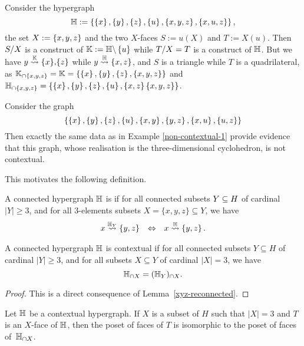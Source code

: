 \begin{example} \label{non-contextual-1}
Consider the hypergraph 
\[
  {\mathbb H}:= \left\{\left\{x\right\},\left\{y\right\},\left\{z\right\},\left\{u\right\},\left\{x,y,z\right\}, \left\{x,u,z\right\}\right\},
  \]
the set $X:=\left\{x,y,z\right\}$ and the two $X$-faces $S:=u(X)$ and $T:=X(u)$. 
Then $S/X$ is a construct of ${\mathbb K}:={\mathbb H}\backslash \left\{u\right\}$ while $T/X=T$ is a construct of ${\mathbb H}$.
But we have $y\stackrel{{\mathbb K}}{\rightsquigarrow}\left\{x\right\}\!,\!\left\{z\right\}$ while $y\stackrel{{\mathbb H}}{\rightsquigarrow}\left\{x,z\right\}$, and $S$ is a triangle while $T$ is a quadrilateral, as
${\mathbb K}_{\cap \left\{x,y,z\right\}} = {\mathbb K}  =  \left\{\left\{x\right\},\left\{y\right\},\left\{z\right\},\left\{x,y,z\right\}\right\}$ and ${\mathbb H}_{\cap \left\{x,y,z\right\}}  =  \left\{\left\{x\right\},\left\{y\right\},\left\{z\right\},\left\{u\right\},\left\{x,z\right\}\left\{x,y,z\right\}\right\}$.
\end{example}
  
\begin{example} 
  \label{non-contextual-2}
Consider the graph 
$$\left\{\left\{x\right\},\left\{y\right\},\left\{z\right\},\left\{u\right\},\left\{x,y\right\}, \left\{y,z\right\}, \left\{x,u\right\}, \left\{u,z\right\}\right\}$$
Then exactly the same data as in Example \ref{non-contextual-1} provide evidence that this graph, whose realisation is the three-dimensional cyclohedron, is not contextual. 
\end{example}

This motivates the following definition.

\begin{definition} 
A connected hypergraph ${\mathbb H}$ is  if for all connected subsets $Y\subseteq H$ of cardinal $|Y|\geq 3$, and for all $3$-elements subsets $X=\{x,y,z\} \subseteq Y$, we have 
$$\begin{array}{lll}
  x\stackrel{{{\mathbb H}_Y}}{\rightsquigarrow}\left\{y,z\right\} & \Leftrightarrow & x\stackrel{{\mathbb H}}{\rightsquigarrow}\left\{y,z\right\}.
  \end{array}$$
\end{definition}

\begin{lemma} \label{context-lemma}
  A connected hypergraph ${\mathbb H}$ is contextual if for all connected subsets $Y \subseteq H$ of cardinal $|Y|\geq 3$, and for all subsets $X \subseteq Y$ of cardinal $|X|=3$, we have
  $${\mathbb H}_{\cap X} = ({\mathbb H}_Y)_{\cap X}.$$ 
\end{lemma}

\begin{proof} 
  This is a direct consequence of Lemma~\ref{xyz-reconnected}.
\end{proof}

\begin{proposition} \label{situation-construct}
Let ${\mathbb H}$ be a contextual hypergraph.
If $X$ is a subset of $H$ such that $|X|=3$ and $T$ is an $X$-face of ${\mathbb H}$, then the poset of faces of $T$ is isomorphic to the poset of faces of~${\mathbb H}_{\cap X}$.
\end{proposition}

